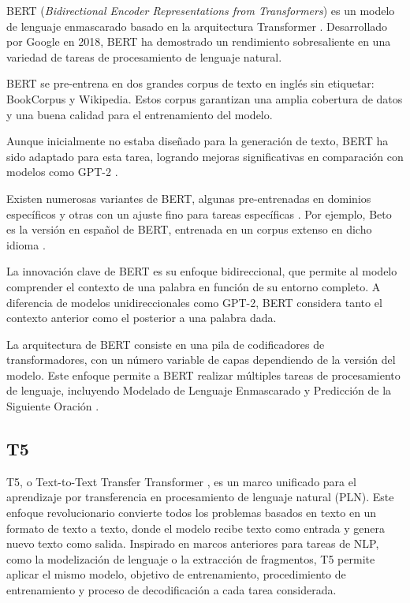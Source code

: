 BERT (\textit{Bidirectional Encoder Representations from Transformers}) es un modelo de lenguaje enmascarado basado en la arquitectura Transformer \cite{devlin2019bert}. Desarrollado por Google en 2018, BERT ha demostrado un rendimiento sobresaliente en una variedad de tareas de procesamiento de lenguaje natural.

BERT se pre-entrena en dos grandes corpus de texto en inglés sin etiquetar: BookCorpus \cite{zhu2015aligning} y Wikipedia. Estos corpus garantizan una amplia cobertura de datos y una buena calidad para el entrenamiento del modelo.

Aunque inicialmente no estaba diseñado para la generación de texto, BERT ha sido adaptado para esta tarea, logrando mejoras significativas en comparación con modelos como GPT-2 \cite{wang2019bert}.

Existen numerosas variantes de BERT, algunas pre-entrenadas en dominios específicos y otras con un ajuste fino para tareas específicas \cite{rajasekharan2019review}. Por ejemplo, Beto es la versión en español de BERT, entrenada en un corpus extenso en dicho idioma \cite{canete2020spanish}.

La innovación clave de BERT es su enfoque bidireccional, que permite al modelo comprender el contexto de una palabra en función de su entorno completo. A diferencia de modelos unidireccionales como GPT-2, BERT considera tanto el contexto anterior como el posterior a una palabra dada.

La arquitectura de BERT consiste en una pila de codificadores de transformadores, con un número variable de capas dependiendo de la versión del modelo. Este enfoque permite a BERT realizar múltiples tareas de procesamiento de lenguaje, incluyendo Modelado de Lenguaje Enmascarado y Predicción de la Siguiente Oración \cite{devlin2019bert}.		


\subsection{T5}

T5, o Text-to-Text Transfer Transformer \cite{T5}, es un marco unificado para el aprendizaje por transferencia en procesamiento de lenguaje natural (PLN). Este enfoque revolucionario convierte todos los problemas basados en texto en un formato de texto a texto, donde el modelo recibe texto como entrada y genera nuevo texto como salida. Inspirado en marcos anteriores para tareas de NLP, como la modelización de lenguaje o la extracción de fragmentos, T5 permite aplicar el mismo modelo, objetivo de entrenamiento, procedimiento de entrenamiento y proceso de decodificación a cada tarea considerada.

